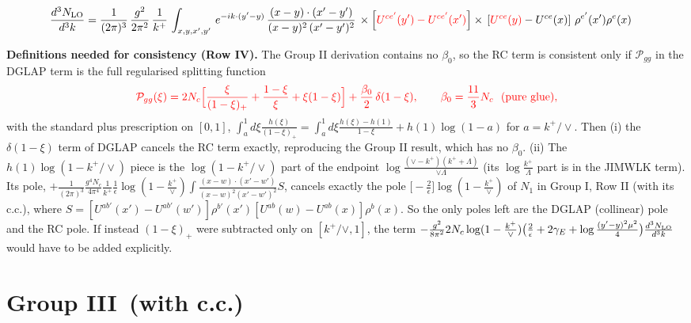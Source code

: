 \documentclass[9pt]{article}
\numberwithin{equation}{section}
\begin{document}
\begin{align}
    \frac{d^{3}N_{\rm LO}}{d^{3}k} & = \frac{1}{(2\pi)^{3}}\, \frac{g^{2}}{2\pi^{2}}\, \frac{1}{k^{+}}\,\int_{x,y,x',y'}\, e^{-ik\cdot (y'-y)}\, \frac{(x-y)\cdot (x'-y')}{(x-y)^{2}\,(x'-y')^{2}}\,\times \left[{\color{red}U^{ce'}(y') - U^{ce'}(x')}\right] \times\, \left[{\color{red}U^{ce}(y)} - U^{ce}(x)\right]\, \rho^{e'}(x') \rho^{e}(x) 
\end{align}
\noindent\begin{minipage}{\linewidth}\color{red}\textbf{Definitions needed for consistency (Row IV).} The Group II derivation contains no $\beta_{0}$, so the RC term is consistent only if $\mathcal{P}_{gg}$ in the DGLAP term is the full regularised splitting function\[\color{red}\mathcal{P}_{gg}(\xi)=2N_{c}\Big[\frac{\xi}{(1-\xi)_{+}}+\frac{1-\xi}{\xi}+\xi(1-\xi)\Big]+\frac{\beta_{0}}{2}\,\delta(1-\xi),\qquad \beta_{0}=\frac{11}{3}N_{c}\ \ (\text{pure glue}),\]with the standard plus prescription on $[0,1]$, $\int_{a}^{1}d\xi\frac{h(\xi)}{(1-\xi)_{+}}=\int_{a}^{1}d\xi\frac{h(\xi)-h(1)}{1-\xi}+h(1)\log(1-a)$ for $a=k^{+}/\vee$. Then (i) the $\delta(1-\xi)$ term of DGLAP cancels the RC term exactly, reproducing the Group II result, which has no $\beta_{0}$. (ii) The $h(1)\log(1-k^{+}/\vee)$ piece is the $\log(1-k^{+}/\vee)$ part of the endpoint $\log\frac{(\vee-k^{+})(k^{+}+\Lambda)}{\vee\Lambda}$ (its $\log\frac{k^{+}}{\Lambda}$ part is in the JIMWLK term). Its pole, $+\frac{1}{(2\pi)^{3}}\frac{g^{4}N_{c}}{4\pi^{4}}\frac{1}{k^{+}}\frac{1}{\epsilon}\log(1-\frac{k^{+}}{\vee})\int\frac{(x-w)\cdot(x'-w')}{(x-w)^{2}(x'-w')^{2}}S$, cancels exactly the pole $\big[-\frac{2}{\epsilon}\big]\log(1-\frac{k^{+}}{\vee})$ of $N_{1}$ in Group I, Row II (with its c.c.), where $S=[U^{ab'}(x')-U^{ab'}(w')]\rho^{b'}(x')[U^{ab}(w)-U^{ab}(x)]\rho^{b}(x)$. So the only poles left are the DGLAP (collinear) pole and the RC pole. If instead $(1-\xi)_{+}$ were subtracted only on $[k^{+}/\vee,1]$, the term $-\frac{g^{2}}{8\pi^{2}}2N_{c}\log(1-\frac{k^{+}}{\vee})\big(\frac{2}{\epsilon}+2\gamma_{E}+\log\frac{(y'-y)^{2}\mu^{2}}{4}\big)\frac{d^{3}N_{\rm LO}}{d^{3}k}$ would have to be added explicitly.\end{minipage}\par
\section{Group III\, (with c.c.)}
\end{document}
